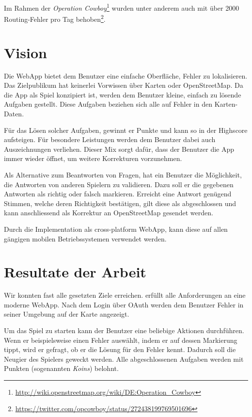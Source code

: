 Im Rahmen der \emph{Operation Cowboy}\footnote{\url{http://wiki.openstreetmap.org/wiki/DE:Operation_Cowboy}} wurden unter anderem auch mit  über 2000 Routing-Fehler pro Tag behoben\footnote{\url{https://twitter.com/opcowboy/status/272438199769501696}}.

\section{Vision}
Die \gls{WebApp} \kort bietet dem Benutzer eine einfache Oberfläche, Fehler zu lokalisieren.
Das Zielpublikum hat keinerlei Vorwissen über Karten oder \gls{OpenStreetMap}.
Da die App als Spiel konzipiert ist, werden dem Benutzer kleine, einfach zu lösende Aufgaben gestellt.
Diese Aufgaben beziehen sich alle auf Fehler in den Karten-Daten.

Für das Lösen solcher Aufgaben, gewinnt er Punkte und kann so in der Highscore aufsteigen.
Für besondere Leistungen werden dem Benutzer dabei auch Auszeichnungen verliehen.
Dieser Mix sorgt dafür, dass der Benutzer die App immer wieder öffnet, um weitere Korrekturen vorzunehmen.

Als Alternative zum Beantworten von Fragen, hat ein Benutzer die Möglichkeit, die Antworten von anderen Spielern zu validieren.
Dazu soll er die gegebenen Antworten als richtig oder falsch markieren.
Erreicht eine Antwort genügend Stimmen, welche deren Richtigkeit bestätigen, gilt diese als abgeschlossen und kann anschliessend als Korrektur an \gls{OpenStreetMap} gesendet werden.

Durch die Implementation als cross-platform \gls{WebApp}, kann diese auf allen gängigen mobilen Betriebssystemen verwendet werden.

\section{Resultate der Arbeit}
Wir konnten fast alle gesetzten Ziele erreichen.
\kort erfüllt alle Anforderungen an eine moderne \gls{WebApp}.
Nach dem Login über \gls{OAuth} werden dem Benutzer Fehler in seiner Umgebung auf der Karte angezeigt.

Um das Spiel zu starten kann der Benutzer eine beliebige Aktionen durchführen.
Wenn er beispielsweise einen Fehler auswählt, indem er auf dessen Markierung tippt, wird er gefragt, ob er die Lösung für den Fehler kennt.
Dadurch soll die Neugier des Spielers geweckt werden.
Alle abgeschlossenen Aufgaben werden mit Punkten (sogenannten \emph{Koins}) belohnt.

